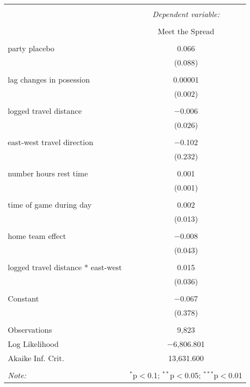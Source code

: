 \documentclass[letterpaper,12pt]{article}
\begin{document}
\begin{tabular}{@{\extracolsep{5pt}}lc}  \\[-1.8ex]\hline  \hline \\[-1.8ex]   & \multicolumn{1}{c}{\textit{Dependent variable:}} \\  \cline{2-2}  \\[-1.8ex] & Meet the Spread \\  \hline \\[-1.8ex]   party placebo & 0.066 \\    & (0.088) \\    & \\   lag changes in posession & 0.00001 \\    & (0.002) \\    & \\   logged travel distance & $-$0.006 \\    & (0.026) \\    & \\   east-west travel direction & $-$0.102 \\    & (0.232) \\    & \\   number hours rest time & 0.001 \\    & (0.001) \\    & \\   time of game during day & 0.002 \\    & (0.013) \\    & \\   home team effect & $-$0.008 \\    & (0.043) \\    & \\   logged travel distance * east-west & 0.015 \\    & (0.036) \\    & \\   Constant & $-$0.067 \\    & (0.378) \\  \hline \\[-1.8ex]  Observations & 9,823 \\  Log Likelihood & $-$6,806.801 \\  Akaike Inf. Crit. & 13,631.600 \\  \hline  \hline \\[-1.8ex]  \textit{Note:}  & \multicolumn{1}{r}{$^{*}$p$<$0.1; $^{**}$p$<$0.05; $^{***}$p$<$0.01} \\  \end{tabular} 
\end{document}
